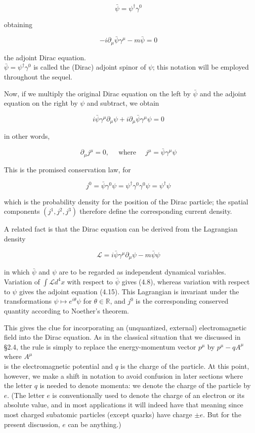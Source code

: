\documentclass[10pt, letterpaper]{article}
\begin{document}
$$
\bar{\psi}=\psi^{\dagger} \gamma^{0}
$$

obtaining

$$
-i \partial_{\mu} \bar{\psi} \gamma^{\mu}-m \bar{\psi}=0
$$

the adjoint Dirac equation.\\
$\bar{\psi}=\psi^{\dagger} \gamma^{0}$ is called the (Dirac) adjoint spinor of $\psi$; this notation will be employed throughout the sequel.

Now, if we multiply the original Dirac equation on the left by $\bar{\psi}$ and the adjoint equation on the right by $\psi$ and subtract, we obtain

$$
i \bar{\psi} \gamma^{\mu} \partial_{\mu} \psi+i \partial_{\mu} \bar{\psi} \gamma^{\mu} \psi=0
$$

in other words,

$$
\partial_{\mu} j^{\mu}=0, \quad \text { where } \quad j^{\mu}=\bar{\psi} \gamma^{\mu} \psi
$$

This is the promised conservation law, for

$$
j^{0}=\bar{\psi} \gamma^{0} \psi=\psi^{\dagger} \gamma^{0} \gamma^{0} \psi=\psi^{\dagger} \psi
$$

which is the probability density for the position of the Dirac particle; the spatial components $\left(j^{1}, j^{2}, j^{3}\right)$ therefore define the corresponding current density.

A related fact is that the Dirac equation can be derived from the Lagrangian density

$$
\mathcal{L}=i \bar{\psi} \gamma^{\mu} \partial_{\mu} \psi-m \bar{\psi} \psi
$$

in which $\bar{\psi}$ and $\psi$ are to be regarded as independent dynamical variables. Variation of $\int \mathcal{L} d^{4} x$ with respect to $\bar{\psi}$ gives (4.8), whereas variation with respect to $\psi$ gives the adjoint equation (4.15). This Lagrangian is invariant under the transformations $\psi \mapsto e^{i \theta} \psi$ for $\theta \in \mathbb{R}$, and $j^{0}$ is the corresponding conserved quantity according to Noether's theorem.

This gives the clue for incorporating an (unquantized, external) electromagnetic field into the Dirac equation. As in the classical situation that we discussed in §2.4, the rule is simply to replace the energy-momentum vector $p^{\mu}$ by $p^{\mu}-q A^{\mu}$ where $A^{\mu}$\\
is the electromagnetic potential and $q$ is the charge of the particle. At this point, however, we make a shift in notation to avoid confusion in later sections where the letter $q$ is needed to denote momenta: we denote the charge of the particle by $e$. (The letter $e$ is conventionally used to denote the charge of an electron or its absolute value, and in most applications it will indeed have that meaning since most charged subatomic particles (except quarks) have charge $\pm e$. But for the present discussion, $e$ can be anything.)
\end{document}
